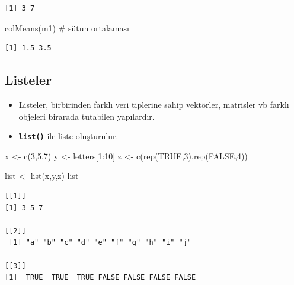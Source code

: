 \documentclass[
  letterpaper,
  DIV=11,
  numbers=noendperiod]{scrreprt}
\newenvironment{Shaded}{\begin{snugshade}}{\end{snugshade}}
\newcommand{\CommentTok}[1]{\textcolor[rgb]{0.37,0.37,0.37}{#1}}
\newcommand{\ConstantTok}[1]{\textcolor[rgb]{0.56,0.35,0.01}{#1}}
\newcommand{\DecValTok}[1]{\textcolor[rgb]{0.68,0.00,0.00}{#1}}
\newcommand{\FunctionTok}[1]{\textcolor[rgb]{0.28,0.35,0.67}{#1}}
\newcommand{\NormalTok}[1]{\textcolor[rgb]{0.00,0.23,0.31}{#1}}
\newcommand{\OtherTok}[1]{\textcolor[rgb]{0.00,0.23,0.31}{#1}}
\newcommand{\SpecialCharTok}[1]{\textcolor[rgb]{0.37,0.37,0.37}{#1}}
\begin{document}
\begin{verbatim}
[1] 3 7
\end{verbatim}

\begin{Shaded}
\begin{Highlighting}[]
\FunctionTok{colMeans}\NormalTok{(m1) }\CommentTok{\# sütun ortalaması}
\end{Highlighting}
\end{Shaded}

\begin{verbatim}
[1] 1.5 3.5
\end{verbatim}

\hypertarget{listeler}{%
\subsection{Listeler}\label{listeler}}

\begin{itemize}
\item
  Listeler, birbirinden farklı veri tiplerine sahip vektörler, matrisler
  vb farklı objeleri birarada tutabilen yapılardır.
\item
  \textbf{\texttt{list()}} ile liste oluşturulur.
\end{itemize}

\begin{Shaded}
\begin{Highlighting}[]
\NormalTok{x }\OtherTok{\textless{}{-}} \FunctionTok{c}\NormalTok{(}\DecValTok{3}\NormalTok{,}\DecValTok{5}\NormalTok{,}\DecValTok{7}\NormalTok{)}
\NormalTok{y }\OtherTok{\textless{}{-}}\NormalTok{ letters[}\DecValTok{1}\SpecialCharTok{:}\DecValTok{10}\NormalTok{]}
\NormalTok{z }\OtherTok{\textless{}{-}} \FunctionTok{c}\NormalTok{(}\FunctionTok{rep}\NormalTok{(}\ConstantTok{TRUE}\NormalTok{,}\DecValTok{3}\NormalTok{),}\FunctionTok{rep}\NormalTok{(}\ConstantTok{FALSE}\NormalTok{,}\DecValTok{4}\NormalTok{))}

\NormalTok{list }\OtherTok{\textless{}{-}} \FunctionTok{list}\NormalTok{(x,y,z)}
\NormalTok{list}
\end{Highlighting}
\end{Shaded}

\begin{verbatim}
[[1]]
[1] 3 5 7

[[2]]
 [1] "a" "b" "c" "d" "e" "f" "g" "h" "i" "j"

[[3]]
[1]  TRUE  TRUE  TRUE FALSE FALSE FALSE FALSE
\end{verbatim}
\end{document}
